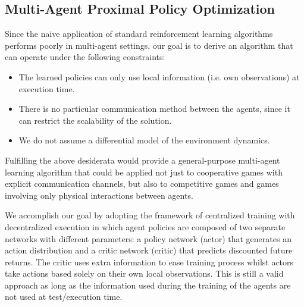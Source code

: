\subsection{Multi-Agent Proximal Policy Optimization}
\label{subsec:41}

Since the naive application of standard reinforcement learning algorithms performs poorly in multi-agent settings, our goal is to derive an algorithm that can operate under the following constraints:
\begin{itemize}
\item{The learned policies can only use local information (i.e. own observations) at execution time.}
\item{There is no particular communication method between the agents, since it can restrict the scalability of the solution.}
\item{We do not assume a differential model of the environment dynamics.}
\end{itemize}
Fulfilling the above desiderata would provide a general-purpose multi-agent learning algorithm that could be applied not just to cooperative games with explicit communication channels, but also to competitive games and games involving only physical interactions between agents.

We accomplish our goal by adopting the framework of centralized training with decentralized execution in which agent policies are composed of two separate networks with different parameters: a policy network (actor) that generates an action distribution and a critic network (critic) that predicts discounted future returns. The critic uses extra information to ease training process whilst actors take actions based solely on their own local observations. This is still a valid approach as long as the information used during the training of the agents are not used at test/execution time.

